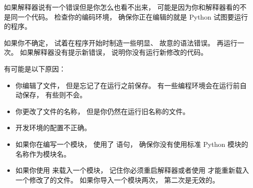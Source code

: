如果解释器说有一个错误但是你怎么也看不出来， 可能是因为你和解释器看的不是同一个代码。
检查你的编码环境， 确保你正在编辑的就是 Python 试图要运行的程序。


如果你不确定， 试着在程序开始时制造一些明显、 故意的语法错误。
再运行一次。  如果解释器没有提示新错误， 说明你没有运行新修改的代码。


有可能是以下原因：

\begin{itemize}


\item 你编辑了文件， 但是忘记了在运行之前保存。  有一些编程环境会在运行前自动保存， 有些则不会。


\item 你更改了文件的名称， 但是你仍然在运行旧名称的文件。


\item 开发环境的配置不正确。


\item 如果你在编写一个模块， 使用了  语句， 确保你没有使用标准 Python 模块的名称作为模块名。


\item 如果你使用  来载入一个模块， 记住你必须重启解释器或者使用  才能重新载入一个修改了的文件。  如果你导入一个模块两次， 第二次是无效的。

\end{itemize}


